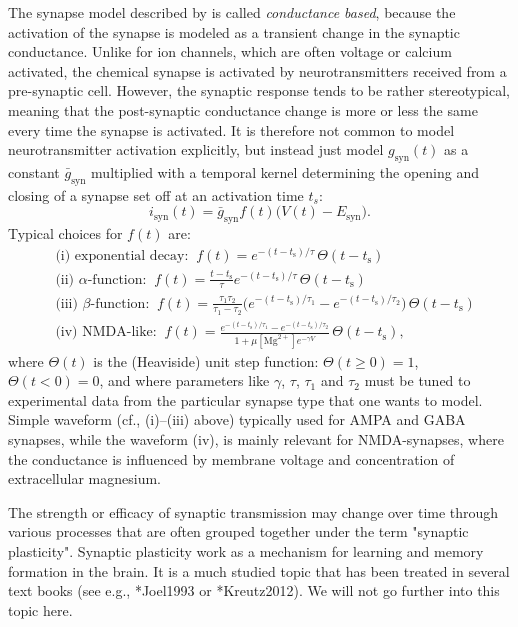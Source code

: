 The synapse model described by  is called \textit{conductance based}, because the activation of the synapse is modeled as a transient change in the synaptic conductance. Unlike for ion channels, which are often voltage or calcium activated, the chemical synapse is activated by neurotransmitters received from a pre-synaptic cell. However, the synaptic response tends to be rather stereotypical, meaning that the post-synaptic conductance change is more or less the same every time the synapse is activated. It is therefore not common to model neurotransmitter activation explicitly, but instead just
model $g_\text{syn}(t)$ as a constant $\bar{g}_\text{syn}$ multiplied with a temporal kernel determining the opening and closing of a synapse set off at an activation time $t_s$:
\begin{equation}
i_\text{syn}(t) = \bar{g}_\text{syn} f(t) \big(V(t)-E_\text{syn} \big).
\label{eq:Neuron:chemicalsynapse}
\end{equation}
Typical choices for $f(t)$ are: 
\begin{align}
&\text{(i) exponential decay:} \;\; f(t) = e^{-(t-t_\text{s})/\tau}\, \Theta(t-t_\text{s}) \\
&\text{(ii) $\alpha$-function:} \;\; f(t) =  \frac{t-t_\text{s}}{\tau} e^{-(t-t_\text{s})/\tau} \, \Theta(t-t_\text{s}) \\
&\text{(iii) $\beta$-function:} \;\; f(t) = \frac{\tau_1 \tau_2}{\tau_1-\tau_2} 
\Big( e^{-(t-t_\text{s})/\tau_1} - e^{-(t-t_\text{s})/\tau_2} \Big) \, \Theta(t-t_\text{s}) \\
& \text{(iv) NMDA-like:} \;\; f(t) = \frac{e^{-(t-t_\text{s})/\tau_1} - e^{-(t-t_\text{s})/\tau_2}} {1+\mu [\text{Mg}^{2+}] e^{-\gamma V} } \, \Theta(t-t_\text{s}),
\label{eq:Neuron:sf4}
\end{align}
where $\Theta(t)$ is the (Heaviside) unit step function: $\Theta(t \ge 0)=1$,  $\Theta(t< 0)=0$, and where parameters like $\gamma$,  $\tau$, $\tau_1$ and $\tau_2$ must be tuned to experimental data from the particular synapse type that one wants to model. Simple waveform (cf., (i)--(iii) above) typically used for AMPA  and GABA synapses, while the waveform (iv), is mainly relevant for NMDA-synapses, where the conductance is influenced by membrane voltage and concentration of extracellular magnesium. 

The strength or efficacy of synaptic transmission may change over time through various processes that are often grouped together under the term "synaptic plasticity". Synaptic plasticity work as a mechanism for learning and memory formation in the brain. It is a much studied topic that has been treated in several text books (see e.g., \citeasnoun**{Joel1993} or \citeasnoun**{Kreutz2012}). We will not go further into this topic here.


